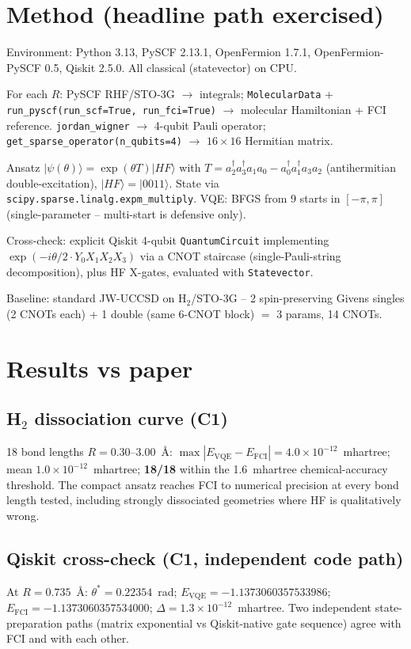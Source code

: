 \documentclass[11pt]{article}
\begin{document}
\section{Method (headline path exercised)}
Environment: Python 3.13, PySCF 2.13.1, OpenFermion 1.7.1, OpenFermion-PySCF 0.5,
Qiskit 2.5.0. All classical (statevector) on CPU.

For each $R$: PySCF RHF/STO-3G $\to$ integrals; \texttt{MolecularData} +
\texttt{run\_pyscf(run\_scf=True, run\_fci=True)} $\to$ molecular Hamiltonian
+ FCI reference. \texttt{jordan\_wigner} $\to$ 4-qubit Pauli operator;
\texttt{get\_sparse\_operator(n\_qubits=4)} $\to$ $16{\times}16$ Hermitian matrix.

Ansatz $|\psi(\theta)\rangle = \exp(\theta T)|HF\rangle$ with
$T = a^\dagger_2 a^\dagger_3 a_1 a_0 - a^\dagger_0 a^\dagger_1 a_3 a_2$
(antihermitian double-excitation), $|HF\rangle=|0011\rangle$. State via
\texttt{scipy.sparse.linalg.expm\_multiply}. VQE: BFGS from 9 starts in
$[-\pi,\pi]$ (single-parameter -- multi-start is defensive only).

Cross-check: explicit Qiskit 4-qubit \texttt{QuantumCircuit} implementing
$\exp(-i\theta/2 \cdot Y_0 X_1 X_2 X_3)$ via a CNOT staircase (single-Pauli-string
decomposition), plus HF X-gates, evaluated with \texttt{Statevector}.

Baseline: standard JW-UCCSD on H$_2$/STO-3G -- 2 spin-preserving Givens singles
(2 CNOTs each) + 1 double (same 6-CNOT block) $=$ 3 params, 14 CNOTs.

\section{Results vs paper}
\subsection*{H$_2$ dissociation curve (C1)}
18 bond lengths $R = 0.30$--$3.00$~\AA:
$\max|E_{\mathrm{VQE}}{-}E_{\mathrm{FCI}}| = 4.0\times 10^{-12}$~mhartree;
mean $1.0\times 10^{-12}$~mhartree; \textbf{18/18} within the 1.6~mhartree
chemical-accuracy threshold. The compact ansatz reaches FCI to numerical
precision at every bond length tested, including strongly dissociated
geometries where HF is qualitatively wrong.

\subsection*{Qiskit cross-check (C1, independent code path)}
At $R=0.735$~\AA: $\theta^* = 0.22354$~rad;
$E_{\mathrm{VQE}} = -1.1373060357533986$; $E_{\mathrm{FCI}} = -1.1373060357534000$;
$\Delta = 1.3\times 10^{-12}$~mhartree. Two independent state-preparation paths
(matrix exponential vs Qiskit-native gate sequence) agree with FCI and with each
other.
\end{document}
